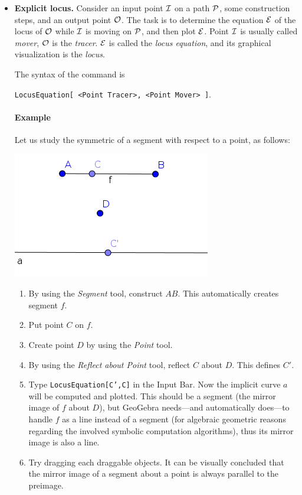 \documentclass{article}
\begin{document}
\begin{itemize}
\item\textbf{Explicit locus.}
Consider an input point $\cal{I}$ on a path $\cal{P}$, some construction steps, and an output point $\cal O$. The task is to determine the equation $\cal E$ of the locus of $\cal O$ while $\cal I$ is moving on $\cal P$, and then plot $\cal E$. Point $\cal I$ is usually called \textit{mover}, $\cal O$ is the \textit{tracer}. $\cal E$ is called the \textit{locus equation}, and its graphical visualization is the \textit{locus}.

The syntax of the command is
\begin{center}
    \texttt{LocusEquation[ <Point Tracer>, <Point Mover> ]}.
\end{center}

\paragraph{Example}
Let us study the symmetric of a segment with respect to a point, as follows: 
\begin{center}
\includegraphics[scale=0.5]{LocusEquation-example-explicit}
\end{center}
\begin{enumerate}
    \item By using the \textit{Segment} tool, construct $AB$. This automatically creates segment $f$.
    \item Put point $C$ on $f$.
    \item Create point $D$ by using the \textit{Point} tool.
    \item By using the \textit{Reflect about Point} tool, reflect $C$ about $D$. This defines $C'$.
    \item Type \texttt{LocusEquation[C',C]} in the Input Bar. Now the implicit curve $a$ will be computed and plotted. This should be a segment (the mirror image of $f$ about $D$), but GeoGebra needs---and automatically does---to handle $f$ as a line instead of a segment (for algebraic geometric reasons regarding the involved symbolic computation algorithms), thus its mirror image is also a line.
    \item Try dragging each draggable objects. It can be visually concluded that the mirror image of a segment about a point is always parallel to the preimage.
\end{enumerate}


\end{itemize}
\end{document}
